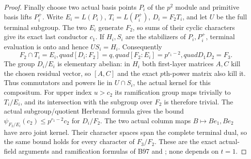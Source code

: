 \begin{proof}
Finally choose two actual basis points $P_i$ of the $p^2$
module and primitive basis lifts $P_i^+$. Write $E_i=L(P_i)$,
$T_i=L(P_i^+)$, $D_i=F_2T_i$, and let $U$ be the full terminal
subgroup. The two $E_i$ generate $F_2$, so sums of their cyclic
characters give its exact last conductor $c_1$.
If $H_i,S_i$ are the stabilizers of $P_i,P_i^+$, terminal
evaluation is onto and hence $US_i=H_i$. Consequently
\[
 F_2\cap T_i=E_i,quad[D_i:F_2]=q,quad
 [F_2:E_i]=p^{r_1-2},quad D_1D_2=F_3.               \tag{B-RD99.11}
\]
The group $D_i/E_i$ is elementary abelian: in $H_i$ both
first-layer matrices $A,C$ kill the chosen residual vector,
so $[A,C]$ and the exact $p$th-power matrix also kill it.
Thus commutators and powers lie in $U\cap S_i$, the actual
kernel for this compositum. For upper index $u>c_2$ its
ramification group maps trivially to $T_i/E_i$, and its
intersection with the subgroup over $F_2$ is therefore trivial.
The actual subgroup/quotient Herbrand formula gives the bound
$\psi_{F_2/E_i}(c_2)\le p^{r_1-2}c_2$ for $D_i/F_2$.
The two actual column maps $B\mapsto Be_1,Be_2$ have zero
joint kernel. Their character spaces span the complete terminal
dual, so the same bound holds for every character of $F_3/F_2$.
These are the exact actual-field arguments and ramification
formulas of B97 and \cite[Proposition3.7, Theorem3.10 and
Proposition3.13, complete proofs, pp.~14--16]{ColmezCorpsLocaux};
none depends on $t=1$.
\end{proof}

